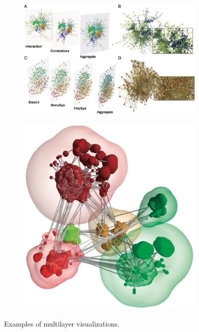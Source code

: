 \begin{figure}[h]
    \centering
    \begin{subfigure}[b]{0.75\columnwidth}
        \centering
        \includegraphics[width=\textwidth]{graphics/muxVisExample.jpg}
        \label{fig:muxVisExample}
    \end{subfigure}
    \begin{subfigure}[b]{0.45\columnwidth}
        \centering
        \includegraphics[width=\textwidth]{graphics/clusteredGraphVis.jpg}
        \label{fig:clusteredGraph}
    \end{subfigure}
    
    \caption[Optional caption for the figure list (often used to abbreviate long captions)]{Examples of multilayer visualizations.} %
    \label{fig:relatedWorkExamples} 
  \end{figure}

